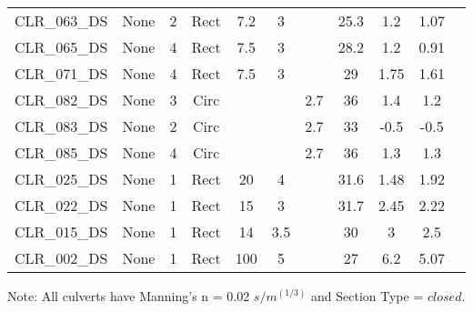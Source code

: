 \begin{table}[]
\begin{tabular}{@{}lcccccccccc@{}}
CLR\_063\_DS  & None       & 2        & Rect & 7.2    & 3     &          & 25.3   & 1.2       & 1.07       \\
CLR\_065\_DS  & None       & 4        & Rect & 7.5    & 3     &          & 28.2   & 1.2       & 0.91       \\
CLR\_071\_DS  & None       & 4        & Rect & 7.5    & 3     &          & 29     & 1.75      & 1.61       \\
CLR\_082\_DS  & None       & 3        & Circ &        &       & 2.7      & 36     & 1.4       & 1.2        \\
CLR\_083\_DS  & None       & 2        & Circ &        &       & 2.7      & 33     & -0.5      & -0.5       \\
CLR\_085\_DS  & None       & 4        & Circ &        &       & 2.7      & 36     & 1.3       & 1.3        \\
CLR\_025\_DS  & None       & 1        & Rect & 20     & 4     &          & 31.6   & 1.48      & 1.92       \\
CLR\_022\_DS  & None       & 1        & Rect & 15     & 3     &          & 31.7   & 2.45      & 2.22       \\
CLR\_015\_DS  & None       & 1        & Rect & 14     & 3.5   &          & 30     & 3         & 2.5        \\
CLR\_002\_DS  & None       & 1        & Rect & 100    & 5     &          & 27     & 6.2       & 5.07       \\
\bottomrule
\end{tabular}

Note: All culverts have Manning's n = 0.02 $s/m^{(1/3)}$ and Section Type = $closed$.
\end{table}

